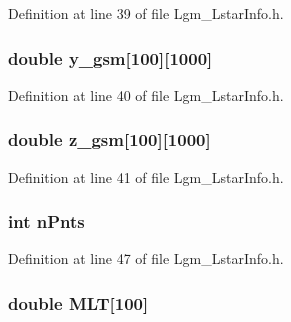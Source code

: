Definition at line 39 of file Lgm\_\-LstarInfo.h.\hypertarget{struct_lgm___lstar_info_713bca9193697dece782322446d6bf4f}{
\subsubsection[{y\_\-gsm}]{\setlength{\rightskip}{0pt plus 5cm}double {\bf y\_\-gsm}\mbox{[}100\mbox{]}\mbox{[}1000\mbox{]}}}
\label{struct_lgm___lstar_info_713bca9193697dece782322446d6bf4f}




Definition at line 40 of file Lgm\_\-LstarInfo.h.\hypertarget{struct_lgm___lstar_info_42b27005ed6595929e25c1e9ca6b9f8d}{
\subsubsection[{z\_\-gsm}]{\setlength{\rightskip}{0pt plus 5cm}double {\bf z\_\-gsm}\mbox{[}100\mbox{]}\mbox{[}1000\mbox{]}}}
\label{struct_lgm___lstar_info_42b27005ed6595929e25c1e9ca6b9f8d}




Definition at line 41 of file Lgm\_\-LstarInfo.h.\hypertarget{struct_lgm___lstar_info_e64e724dd0713b2ba2fca5aedab3fd34}{
\subsubsection[{nPnts}]{\setlength{\rightskip}{0pt plus 5cm}int {\bf nPnts}}}
\label{struct_lgm___lstar_info_e64e724dd0713b2ba2fca5aedab3fd34}




Definition at line 47 of file Lgm\_\-LstarInfo.h.\hypertarget{struct_lgm___lstar_info_81220a2a156b6eaf6e17f742e55648e0}{
\subsubsection[{MLT}]{\setlength{\rightskip}{0pt plus 5cm}double {\bf MLT}\mbox{[}100\mbox{]}}}
\label{struct_lgm___lstar_info_81220a2a156b6eaf6e17f742e55648e0}




